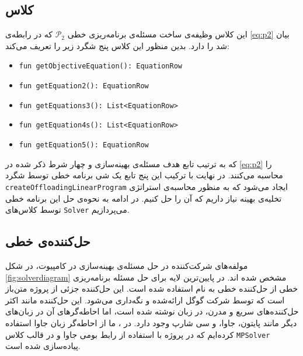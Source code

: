 \subsection{کلاس }
این کلاس وظیفه‌ی ساخت مسئله‌ی برنامه‌ریزی خطی
$\mathcal{P}_2$
که در رابطه‌ی \ref{eq:p2} بیان شد را دارد. بدین منظور این کلاس پنج شگرد زیر را تعریف می‌کند:
\begin{latin}
	\begin{itemize}
		\item \texttt{\footnotesize fun getObjectiveEquation(): EquationRow}
		\item \texttt{\footnotesize fun getEquation2(): EquationRow}
		\item \texttt{\footnotesize fun getEquations3(): List<EquationRow>}
		\item \texttt{\footnotesize fun getEquation4s(): List<EquationRow>}
		\item \texttt{\footnotesize fun getEquation5(): EquationRow}
	\end{itemize}
\end{latin}
که به ترتیب تابع هدف مسئله‌ی بهینه‌سازی و چهار شرط ذکر شده در \ref{eq:p2} را محاسبه می‌کنند. در نهایت با ترکیب این پنج تابع یک شی برنامه خطی توسط شگرد \texttt{\footnotesize createOffloadingLinearProgram} ایجاد می‌شود که به منظور محاسبه‌ی استراتژی تخلیه‌ی بهینه نیاز داریم که آن را حل کنیم. در ادامه به نحوه‌ی حل این برنامه خطی توسط کلاس‌های \texttt{\footnotesize Solver} می‌پردازیم.
\subsection{حل‌کننده‌ی خطی}
مولفه‌های شرکت‌کننده در حل مسئله‌ی بهینه‌سازی در کامپیوت، در شکل \ref{fig:solverdiagram} مشخص شده اند. در پایین‌ترین لایه برای حل مسئله برنامه‌ریزی خطی از حل‌کننده خطی  به نام  استفاده شده است. این حل‌کننده جزئی از پروژه متن‌باز  است که توسط شرکت گوگل ارائه‌شده و نگه‌داری می‌شود. \cite{glop} این حل‌کننده مانند اکثر حل‌کننده‌های سریع و مدرن، در زبان  نوشته شده است، اما احاطه‌گرهای آن در زبان‌های دیگر مانند پایتون، جاوا، و سی شارپ وجود دارد. در \CurrentProject، ما از احاطه‌گر زبان جاوا استفاده کرده‌ایم که در پروژه  با استفاده از رابط بومی جاوا و در قالب کلاس \texttt{\footnotesize MPSolver} پیاده‌سازی شده است. \\

